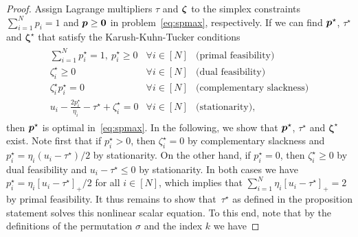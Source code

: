 \documentclass[11pt, a4paper, oneside, reqno]{article}
\begin{document}
	\begin{proof}
	Assign Lagrange multipliers $\tau$ and $\boldsymbol \zeta$ to the simplex constraints $\sum_{i=1}^N p_i=1$ and $\boldsymbol p\ge \boldsymbol 0$ in problem~\eqref{eq:spmax}, respectively. If we can find $\boldsymbol p^\star$, $\tau^\star$ and $\bm \zeta^\star$ that satisfy the Karush-Kuhn-Tucker conditions
    \begin{align*}
		    \begin{array}{lll}
		    \sum_{i=1}^N p^\star_i =1, ~p^\star_i \geq 0 & \forall i \in [N] & \text{(primal feasibility)}\\
		    \zeta^\star_i\geq 0 & \forall i \in [N] & \text{(dual feasibility)}\\ \zeta_i^\star p_i^\star=0 & \forall i \in [N] & \text{(complementary slackness)} \\
		    u_i - \frac{2 p_i^\star}{\eta_i} - \tau^\star + \zeta^\star_i = 0 & \forall i \in [N] & \text{(stationarity)},
		    \end{array}
		\end{align*}
		then $\boldsymbol p^\star$ is optimal in~\eqref{eq:spmax}.
	In the following, we show that $\boldsymbol p^\star$, $\tau^\star$ and $\bm \zeta^\star$ exist. Note first that if $p_i^\star > 0$, then $\zeta_i^\star = 0$ by complementary slackness and $p_i^\star = \eta_i (u_i - \tau^\star) / 2$ by stationarity. On the other hand, if $p_i^\star = 0$, then $\zeta_i^\star \geq 0$ by dual feasibility and $u_i - \tau^\star \leq 0$ by stationarity. In both cases we have $p_i^\star = \eta_i [u_i - \tau^\star]_+ / 2$ for all $i\in[N]$, which implies that $\sum_{i=1}^N \eta_i [u_i - \tau^\star]_+ = 2$ by primal feasibility. It thus remains to show that~$\tau^\star$ as defined in the proposition statement solves this nonlinear scalar equation. To this end, note that by the definitions of the permutation $\sigma$ and the index $k$ we have

\end{proof}
\end{document}
